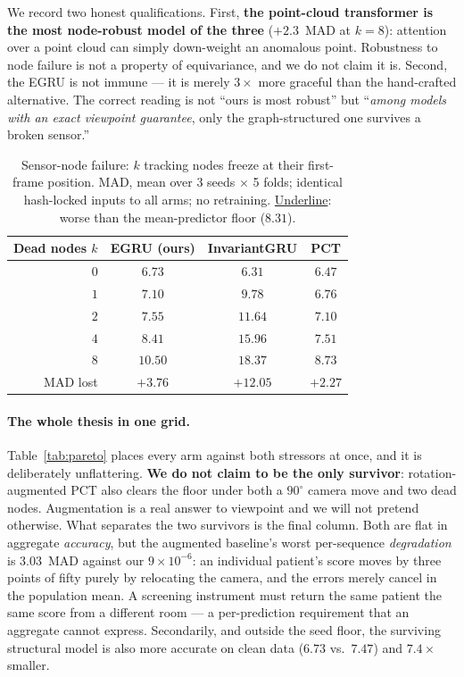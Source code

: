 We record two honest qualifications. First, \textbf{the point-cloud transformer is the most
node-robust model of the three} ($+2.3$~MAD at $k=8$): attention over a point cloud can simply
down-weight an anomalous point. Robustness to node failure is not a property of equivariance, and we
do not claim it is. Second, the EGRU is not immune --- it is merely $3\times$ more graceful than the
hand-crafted alternative. The correct reading is not ``ours is most robust'' but ``\emph{among models
with an exact viewpoint guarantee}, only the graph-structured one survives a broken sensor.''

\begin{table}[!t]
\centering
\caption{Sensor-node failure: $k$ tracking nodes freeze at their first-frame position. MAD, mean over
3 seeds $\times$ 5 folds; identical hash-locked inputs to all arms; no retraining. \underline{Underline}:
worse than the mean-predictor floor ($8.31$).}
\label{tab:nodefail}
\small
\begin{tabular}{rccc}
\toprule
Dead nodes $k$ & EGRU (ours) & InvariantGRU & PCT \\
\midrule
$0$ & $6.73$ & $6.31$ & $6.47$ \\
$1$ & $7.10$ & \underline{$9.78$}  & $6.76$ \\
$2$ & $7.55$ & \underline{$11.64$} & $7.10$ \\
$4$ & $8.41$ & \underline{$15.96$} & $7.51$ \\
$8$ & \underline{$10.50$} & \underline{$18.37$} & $8.73$ \\
\midrule
MAD lost & $+3.76$ & $+12.05$ & $\mathbf{+2.27}$ \\
\bottomrule
\end{tabular}
\end{table}

\paragraph{The whole thesis in one grid.} Table~\ref{tab:pareto} places every arm against both
stressors at once, and it is deliberately unflattering. \textbf{We do not claim to be the only
survivor}: rotation-augmented PCT also clears the floor under both a $90^\circ$ camera move and two
dead nodes. Augmentation is a real answer to viewpoint and we will not pretend otherwise. What
separates the two survivors is the final column. Both are flat in aggregate \emph{accuracy}, but the
augmented baseline's worst per-sequence \emph{degradation} is $3.03$~MAD against our
$9\times10^{-6}$: an individual patient's score moves by three points of fifty purely by relocating
the camera, and the errors merely cancel in the population mean. A screening instrument must return
the same patient the same score from a different room --- a per-prediction requirement that an
aggregate cannot express. Secondarily, and outside the seed floor, the surviving structural model is
also more accurate on clean data ($6.73$ vs.\ $7.47$) and $7.4\times$ smaller.


